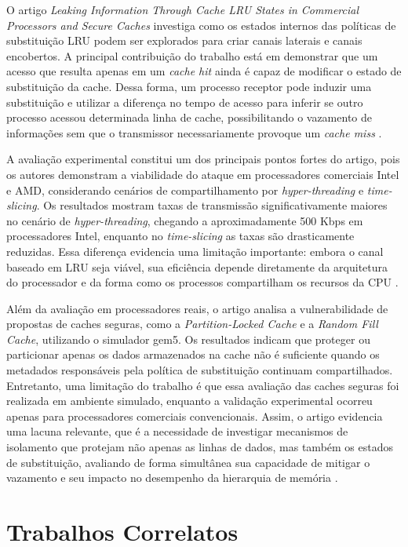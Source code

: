 \documentclass[12pt]{article}
\begin{document}
O artigo \textit{Leaking Information Through Cache LRU States in Commercial Processors and Secure Caches}\cite{9354935} investiga como os estados internos das políticas de substituição LRU podem ser explorados para criar canais laterais e canais encobertos. A principal contribuição do trabalho está em demonstrar que um acesso que resulta apenas em um \textit{cache hit} ainda é capaz de modificar o estado de substituição da cache. Dessa forma, um processo receptor pode induzir uma substituição e utilizar a diferença no tempo de acesso para inferir se outro processo acessou determinada linha de cache, possibilitando o vazamento de informações sem que o transmissor necessariamente provoque um \textit{cache miss} \cite{9354935}.

A avaliação experimental constitui um dos principais pontos fortes do artigo, pois os autores demonstram a viabilidade do ataque em processadores comerciais Intel e AMD, considerando cenários de compartilhamento por \textit{hyper-threading} e \textit{time-slicing}. Os resultados mostram taxas de transmissão significativamente maiores no cenário de \textit{hyper-threading}, chegando a aproximadamente 500 Kbps em processadores Intel, enquanto no \textit{time-slicing} as taxas são drasticamente reduzidas. Essa diferença evidencia uma limitação importante: embora o canal baseado em LRU seja viável, sua eficiência depende diretamente da arquitetura do processador e da forma como os processos compartilham os recursos da CPU \cite{9354935}.

Além da avaliação em processadores reais, o artigo analisa a vulnerabilidade de propostas de caches seguras, como a \textit{Partition-Locked Cache} e a \textit{Random Fill Cache}, utilizando o simulador gem5. Os resultados indicam que proteger ou particionar apenas os dados armazenados na cache não é suficiente quando os metadados responsáveis pela política de substituição continuam compartilhados. Entretanto, uma limitação do trabalho é que essa avaliação das caches seguras foi realizada em ambiente simulado, enquanto a validação experimental ocorreu apenas para processadores comerciais convencionais. Assim, o artigo evidencia uma lacuna relevante, que é a necessidade de investigar mecanismos de isolamento que protejam não apenas as linhas de dados, mas também os estados de substituição, avaliando de forma simultânea sua capacidade de mitigar o vazamento e seu impacto no desempenho da hierarquia de memória \cite{9354935}.

\section{Trabalhos Correlatos}
\end{document}
